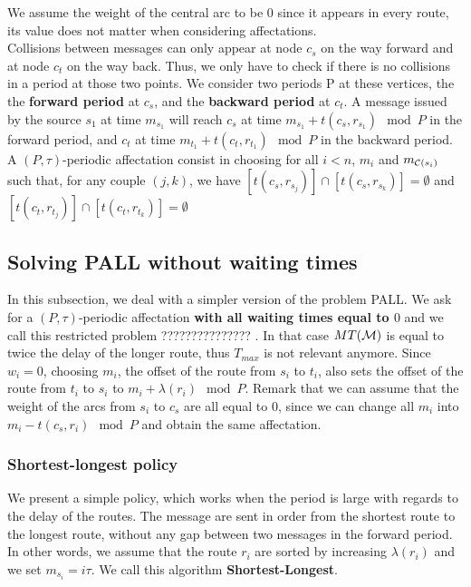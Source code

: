 \documentclass[a4paper,10pt]{article}
\begin{document}
      We assume the weight of the central arc to be $0$ since it appears in every route,
      its value does not matter when considering affectations.\\
      Collisions between messages can only appear at node $c_s$ on the way forward and at node $c_t$ on the way back.
      Thus, we only have to check if there is no collisions in a period at those two points.
      We consider two periods P at these vertices, the the {\bf forward period} at $c_s$, and the {\bf backward period} at $c_t$. A message issued by the source $s_1$ at time $m_{s_1}$ will reach $c_s$ at time $m_{s_1} + t(c_s,r_{s_1}) \mod P$ in the forward period, and  $c_t$ at time $m_{t_1} + t(c_t,r_{t_1})\mod P$ in the backward period.
      A $(P,\tau)$-periodic affectation consist in choosing for all $i < n$, $m_i$ and $m_{{\cal C}(s_i)}$ such that, for any couple $(j,k)$,
      we have $[t(c_s,r_{s_{j}})] \cap [t(c_s,r_{s_k})] = \emptyset$ and $[t(c_t,r_{t_j})] \cap [t(c_t,r_{t_k})] = \emptyset$

      

  \subsection{Solving PALL without waiting times}
  
  In this subsection, we deal with a simpler version of the problem PALL.
  We ask for a $(P,\tau)$-periodic affectation {\bf with all waiting times equal to $0$} and we call this restricted problem  ??????????????? . 
  In that case $MT({\cal M})$ is equal to twice the delay of the longer route, thus $T_{max}$ is not relevant anymore. 
  Since $w_i=0$, choosing $m_i$, the offset of the route from $s_i$ to $t_i$, also sets the offset of the route from $t_i$ to $s_i$ to $m_i + \lambda(r_i) \mod P$.
  Remark that we can assume that the weight of the arcs from $s_i$ to $c_s$ are all equal to $0$, since we can change 
  all $m_i$ into $m_i - t(c_s,r_i) \mod P$ and obtain the same affectation.
  
  
    
  
    \subsubsection{Shortest-longest policy}
    

    
    We present a simple policy, which works when the period is large with regards to the delay of the routes.
    The message are sent in order from the shortest route to the longest route, without any gap between two messages in the forward period.
    In other words, we assume that the route $r_i$ are sorted by increasing $\lambda(r_i)$ and we set $m_{s_i} = i\tau$.
    We call this algorithm {\bf Shortest-Longest}.
      
\end{document}
